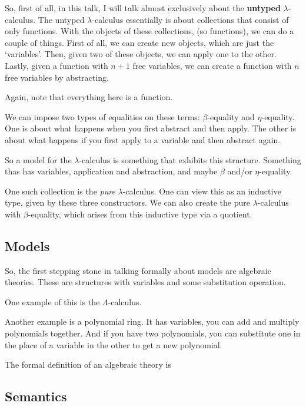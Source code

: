 \documentclass{amsart}
\begin{document}
  So, first of all, in this talk, I will talk almost exclusively about the \textbf{untyped} $ \lambda $-calculus. The untyped $ \lambda $-calculus essentially is about collections that consist of only functions. With the objects of these collections, (so functions), we can do a couple of things. First of all, we can create new objects, which are just the `variables'. Then, given two of these objects, we can apply one to the other. Lastly, given a function with $ n + 1 $ free variables, we can create a function with $ n $ free variables by abstracting.

  Again, note that everything here is a function.

  We can impose two types of equalities on these terms: $ \beta $-equality and $ \eta $-equality. One is about what happens when you first abstract and then apply. The other is about what happens if you first apply to a variable and then abstract again.

  So a model for the $ \lambda $-calculus is something that exhibits this structure. Something thas has variables, application and abstraction, and maybe $ \beta $ and/or $ \eta $-equality.

  One such collection is the \textit{pure} $ \lambda $-calculus. One can view this as an inductive type, given by these three constructors. We can also create the pure $ \lambda $-calculus with $ \beta $-equality, which arises from this inductive type via a quotient.

  \subsection{Models}

  So, the first stepping stone in talking formally about models are algebraic theories. These are structures with variables and some substitution operation.

  One example of this is the $ \Lambda $-calculus.

  Another example is a polynomial ring. It has variables, you can add and multiply polynomials together. And if you have two polynomials, you can substitute one in the place of a variable in the other to get a new polynomial.

  The formal definition of an algebraic theory is

  \subsection{Semantics}
\end{document}
